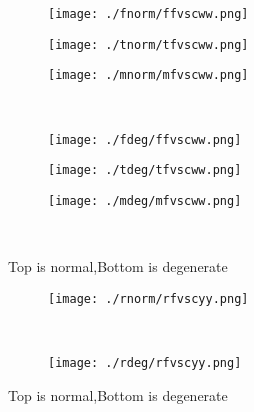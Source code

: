 \documentclass[aps,floats,floatfix,nofootinbib]{revtex4-1}
\begin{document}
\begin{center}
\begin{figure}
\begin{subfigure}{0.3\textwidth}
\texttt{[image: ./fnorm/ffvscww.png]}
\label{}
\end{subfigure}
\begin{subfigure}{0.3\textwidth}
\texttt{[image: ./tnorm/tfvscww.png]}
\label{}
\end{subfigure}
\begin{subfigure}{0.3\textwidth}
\texttt{[image: ./mnorm/mfvscww.png]}
\label{}
\end{subfigure}\\
\begin{subfigure}{0.3\textwidth}
\texttt{[image: ./fdeg/ffvscww.png]}
\label{}
\end{subfigure}
\begin{subfigure}{0.3\textwidth}
\texttt{[image: ./tdeg/tfvscww.png]}
\label{}
\end{subfigure}
\begin{subfigure}{0.3\textwidth}
\texttt{[image: ./mdeg/mfvscww.png]}
\label{}
\end{subfigure}\\
\caption{Top is normal,Bottom is degenerate}
\end{figure}
\end{center}

\begin{center}
\begin{figure}
\begin{subfigure}{0.95\textwidth}
\texttt{[image: ./rnorm/rfvscyy.png]}
\label{}
\end{subfigure}\\
\begin{subfigure}{0.95\textwidth}
\texttt{[image: ./rdeg/rfvscyy.png]}
\label{}
\end{subfigure}
\caption{Top is normal,Bottom is degenerate}
\end{figure}
\end{center}
\end{document}
